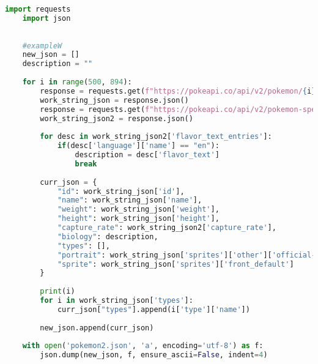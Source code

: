 \begin{lstlisting}[language=Python, caption=Python example]
    import requests
    import json
    
    
    #exampleW
    new_json = []
    description = ""
    
    for i in range(500, 894):
        response = requests.get(f"https://pokeapi.co/api/v2/pokemon/{i}/")
        work_string_json = response.json()
        response = requests.get(f"https://pokeapi.co/api/v2/pokemon-species/{i}/")
        work_string_json2 = response.json()
    
        for desc in work_string_json2['flavor_text_entries']:
            if(desc['language']['name'] == "en"):
                description = desc['flavor_text']
                break
    
        curr_json = {
            "id": work_string_json['id'],
            "name": work_string_json['name'],
            "weight": work_string_json['weight'],
            "height": work_string_json['height'],
            "capture_rate": work_string_json2['capture_rate'],
            "biology": description,
            "types": [],
            "portrait": work_string_json['sprites']['other']['official-artwork']['front_default'],
            "sprite": work_string_json['sprites']['front_default']
        }
    
        print(i)
        for i in work_string_json['types']:
            curr_json["types"].append(i['type']['name'])
    
        new_json.append(curr_json)
        
    with open('pokemon2.json', 'a', encoding='utf-8') as f:
        json.dump(new_json, f, ensure_ascii=False, indent=4)
    
\end{lstlisting}


